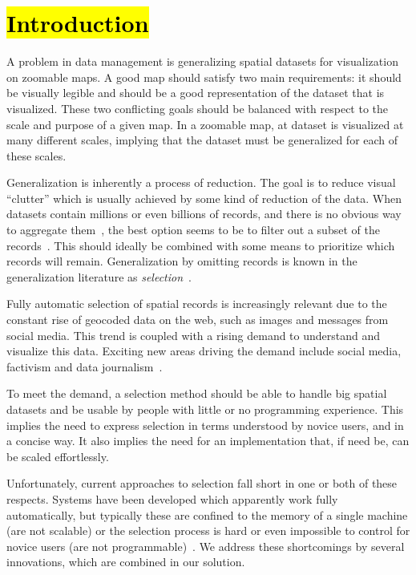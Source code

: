 \section{\hl{Introduction}}
A problem in data management is generalizing spatial datasets for visualization on zoomable maps. A good map should satisfy two main requirements: it should be visually legible and should be a good representation of the dataset that is visualized. These two conflicting goals should be balanced with respect to the scale and purpose of a given map. In a zoomable map, at dataset is visualized at many different scales, implying that the dataset must be generalized for each of these scales. 

Generalization is inherently a process of reduction. The goal is to reduce visual ``clutter'' which is usually achieved by some kind of reduction of the data. When datasets contain millions or even billions of records, and there is no obvious way to aggregate them~\cite{haunert2006landcover}, the best option seems to be to filter out a subset of the records~\cite{sarma2012fusiontables}. This should ideally be combined with some means to prioritize which records will remain. Generalization by omitting records is known in the generalization literature as \emph{selection}~\cite{weibel1999generalising}.

Fully automatic selection of spatial records is increasingly relevant due to the constant rise of geocoded data on the web, such as images and messages from social media. This trend is coupled with a rising demand to understand and visualize this data. Exciting new areas driving the demand include social media, factivism and data journalism~\cite{cohen2011journalism}. 

To meet the demand, a selection method should be able to handle big spatial datasets and be usable by people with little or no programming experience. This implies the need to express selection in terms understood by novice users, and in a concise way. It also implies the need for an implementation that, if need be, can be scaled effortlessly.

Unfortunately, current approaches to selection fall short in one or both of these respects. Systems have been developed which apparently work fully automatically, but typically these are confined to the memory of a single machine (are not scalable) or the selection process is hard or even impossible to control for novice users (are not programmable)~\cite{sarma2012fusiontables}. We address these shortcomings by several innovations, which are combined in our solution.

